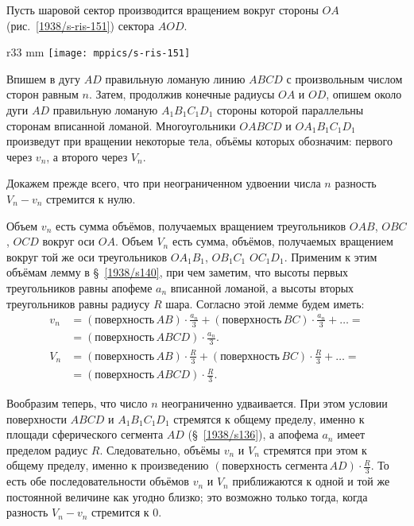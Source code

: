 Пусть шаровой сектор производится вращением вокруг стороны $OA$ (рис.~\ref{1938/s-ris-151}) сектора $AOD$.

\begin{wrapfigure}{r}{33 mm}
\vskip-0mm
\centering
\texttt{[image: mppics/s-ris-151]}
\caption{}\label{1938/s-ris-151}
\vskip-0mm
\end{wrapfigure}

Впишем в дугу $AD$ правильную ломаную линию $ABCD$ с произвольным числом сторон равным $n$.
Затем, продолжив конечные радиусы $OA$ и $OD$, опишем около дуги $AD$ правильную ломаную $A_1B_1C_1D_1$ стороны которой параллельны сторонам вписанной ломаной.
Многоугольники $OABCD$ и $OA_1B_1C_1D_1$ произведут при вращении некоторые тела, объёмы которых обозначим: первого через $v_n$, а второго через $V_n$.

Докажем прежде всего, что при неограниченном удвоении числа $n$ разность $V_n-v_n$ стремится к нулю.

Объем $v_n$ есть сумма объёмов, получаемых вращением треугольников $OAB$, $OBC$, $OCD$ вокруг оси $OA$.
Объем $V_n$ есть сумма, объёмов, получаемых вращением вокруг той же оси треугольников $OA_1B_1$, $OB_1C_1$ $OC_1D_1$.
Применим к этим объёмам лемму в §~\ref{1938/s140}, при чем заметим, что высоты первых треугольников равны апофеме $a_n$ вписанной ломаной, а высоты вторых треугольников равны радиусу $R$ шара.
Согласно этой лемме будем иметь:
\begin{align*}
v_n&=
(\text{поверхность}\, AB)\cdot\tfrac {a_n}3
+
(\text{поверхность}\, BC)\cdot\tfrac {a_n}3
+
\dots=
\\
&=
(\text{поверхность}\, ABCD)\cdot \tfrac {a_n}3.
\\
V_n&=
(\text{поверхность}\, AB)\cdot\tfrac R3
+
(\text{поверхность}\, BC)\cdot\tfrac R3
+
\dots=
\\
&=
(\text{поверхность}\, ABCD)\cdot \tfrac R3.
\end{align*}


Вообразим теперь, что число $n$ неограниченно удваивается.
При этом условии поверхности $ABCD$ и $A_1B_1C_1D_1$ стремятся к общему пределу, именно к площади сферического сегмента $AD$ (§~\ref{1938/s136}), а апофема $a_n$ имеет пределом радиус $R$.
Следовательно, объёмы $v_n$ и $V_n$ стремятся при этом к общему пределу, именно к произведению $(\text{поверхность сегмента}\,  AD)\cdot \tfrac R3$.
То есть обе последовательности объёмов $v_n$ и $V_n$ приближаются к одной и той же постоянной величине как угодно близко; это возможно только тогда, когда разность $V_n-v_n$ стремится к $0$.

